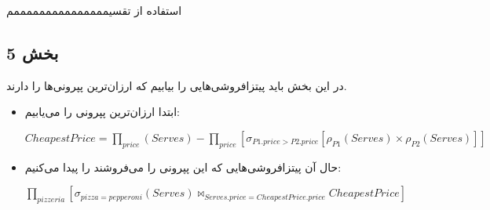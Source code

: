 استفاده از تقسیمممممممممممممممم

\subsection*{بخش 5}
در این بخش باید پیتزافروشی‌هایی را بیابیم که ارزان‌ترین پپرونی‌ها را دارند.
\begin{itemize}
	\item ابتدا ارزان‌ترین پپرونی را می‌یابیم:
	
	\setLTR
	$CheapestPrice = \prod_{price}(Serves) - \prod_{price}[\sigma_{P1.price>P2.price}[\rho_{P1}(Serves)\times\rho_{P2}(Serves)]]$
	\setRTL
	
	\item حال آن پیتزافروشی‌هایی که این پپرونی را می‌فروشند را پیدا می‌کنیم:
	
	\setLTR
	
	$\prod_{pizzeria}[\sigma_{pizza=pepperoni}(Serves)\bowtie_{Serves.price = CheapestPrice.price}CheapestPrice]$
	\setRTL
\end{itemize}